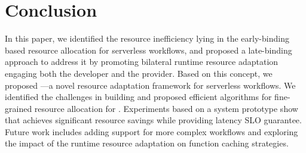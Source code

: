 \section{Conclusion}
\label{sec:conclusion}
In this paper, we identified the resource inefficiency lying in the early-binding based resource allocation for serverless workflows, and proposed a late-binding approach to address it by promoting bilateral runtime resource adaptation engaging both the developer and the provider.
Based on this concept, we proposed \namex---a novel resource adaptation framework for serverless workflows. 
We identified the challenges in building \namex and proposed efficient algorithms for fine-grained resource allocation %
for \namex.
Experiments based on a system prototype show that \namex achieves significant resource savings while providing latency SLO guarantee.
Future work includes adding support for more complex workflows and exploring the impact of the runtime resource adaptation on function caching strategies.



